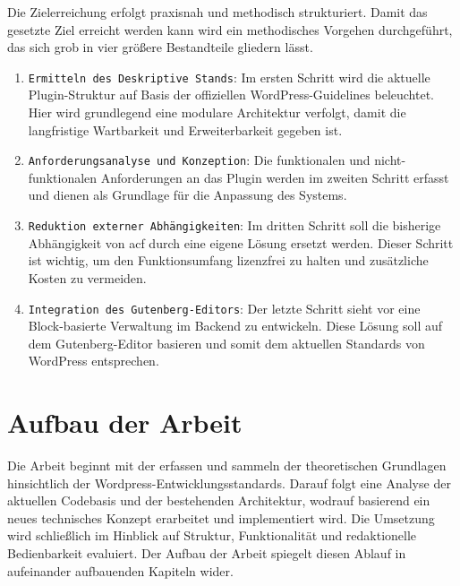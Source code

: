 Die Zielerreichung erfolgt praxisnah und methodisch strukturiert.
Damit das gesetzte Ziel erreicht werden kann wird ein methodisches Vorgehen durchgeführt, das sich grob in vier größere Bestandteile gliedern lässt.

\begin{enumerate}
    \item \texttt{Ermitteln des Deskriptive Stands}: Im ersten Schritt wird die aktuelle Plugin-Struktur auf Basis der offiziellen WordPress-Guidelines beleuchtet.
    Hier wird grundlegend eine modulare Architektur verfolgt, damit die langfristige Wartbarkeit und Erweiterbarkeit gegeben ist.

    \item \texttt{Anforderungsanalyse und Konzeption}: Die funktionalen und nicht-funktionalen Anforderungen an das Plugin werden im zweiten Schritt erfasst und dienen als Grundlage für die Anpassung des Systems.

    \item \texttt{Reduktion externer Abhängigkeiten}: Im dritten Schritt soll die bisherige Abhängigkeit von \gls{acf} durch eine eigene Lösung ersetzt werden.
    Dieser Schritt ist wichtig, um den Funktionsumfang lizenzfrei zu halten und zusätzliche Kosten zu vermeiden.

    \item \texttt{Integration des Gutenberg-Editors}: Der letzte Schritt sieht vor eine Block-basierte Verwaltung im Backend zu entwickeln.
    Diese Lösung soll auf dem Gutenberg-Editor basieren und somit dem aktuellen Standards von WordPress entsprechen.
\end{enumerate}

\section{Aufbau der Arbeit}

Die Arbeit beginnt mit der erfassen und sammeln der theoretischen Grundlagen hinsichtlich der Wordpress-Entwicklungsstandards.
Darauf folgt eine Analyse der aktuellen Codebasis und der bestehenden Architektur, wodrauf basierend ein neues technisches Konzept erarbeitet und implementiert wird.
Die Umsetzung wird schließlich im Hinblick auf Struktur, Funktionalität und redaktionelle Bedienbarkeit evaluiert.
Der Aufbau der Arbeit spiegelt diesen Ablauf in aufeinander aufbauenden Kapiteln wider.


